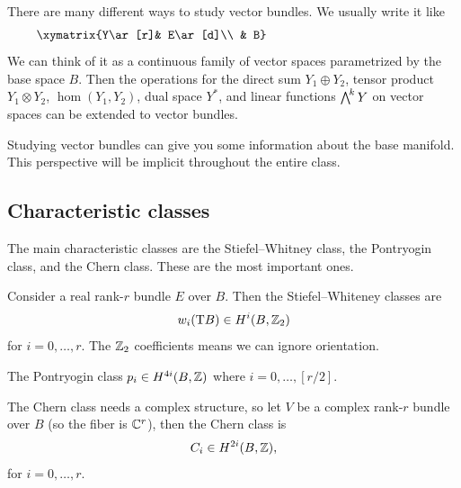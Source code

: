 \begin{node}
There are many different ways to study vector bundles. We usually
write it like
\begin{equation}
\vcenter{\xymatrix{Y\ar[r]& E\ar[d]\\
& B}}
\end{equation}
We can think of it as a continuous family of vector spaces
parametrized by the base space $B$. Then the operations for the direct
sum $Y_{1}\oplus Y_{2}$, tensor product $Y_{1}\otimes Y_{2}$,
$\hom(Y_{1},Y_{2})$, dual space $Y^{*}$, and linear functions
$\extp^{k}Y$ on vector spaces can be extended to  vector bundles.
\end{node}

\begin{node}
Studying vector bundles can give you some information about the base
manifold. This perspective will be implicit throughout the entire class.
\end{node}

\subsection{Characteristic classes}

\begin{node}
The main characteristic classes are the Stiefel--Whitney class, the
Pontryogin class, and the Chern class. These are the most important ones.
\end{node}

\begin{node}
Consider a real rank-$r$ bundle $E$ over $B$. Then the
Stiefel--Whiteney classes are
\begin{equation}
w_{i}(\mathrm{T} B)\in H^{i}(B,\mathbb{Z}_{2})
\end{equation}
for $i=0,\dots,r$. The $\mathbb{Z}_{2}$ coefficients means we can ignore
orientation. 
\end{node}

\begin{node}
The Pontryogin class $p_{i}\in H^{4i}(B,\mathbb{Z})$ where $i=0,\dots,[r/2]$.
\end{node}

\begin{node}
The Chern class needs a complex structure, so let $V$ be a complex
rank-$r$ bundle over $B$ (so the fiber is $\mathbb{C}^{r}$), then the Chern
class is
\begin{equation*}
C_{i}\in H^{2i}(B,\mathbb{Z}),
\end{equation*}
for $i=0,\dots,r$.
\end{node}

